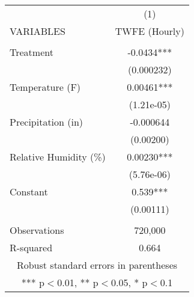 \begin{tabular}{lc} \hline
 & (1) \\
VARIABLES & TWFE (Hourly) \\ \hline
 &  \\
Treatment & -0.0434*** \\
 & (0.000232) \\
Temperature (F) & 0.00461*** \\
 & (1.21e-05) \\
Precipitation (in) & -0.000644 \\
 & (0.00200) \\
Relative Humidity (\%) & 0.00230*** \\
 & (5.76e-06) \\
Constant & 0.539*** \\
 & (0.00111) \\
 &  \\
Observations & 720,000 \\
 R-squared & 0.664 \\ \hline
\multicolumn{2}{c}{ Robust standard errors in parentheses} \\
\multicolumn{2}{c}{ *** p$<$0.01, ** p$<$0.05, * p$<$0.1} \\
\end{tabular}
